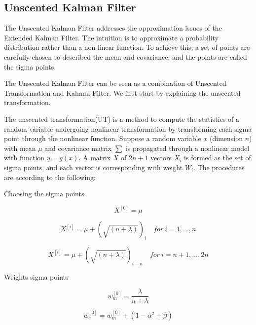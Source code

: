 \documentclass[10pt,twocolumn,letterpaper]{article}
\begin{document}
\subsection{Unscented Kalman Filter}

The Unscented Kalman Filter\cite{ref:Julier} addresses the approximation issues of the Extended Kalman Filter. The intuition is to approximate a probability distribution rather than a non-linear function. To achieve this, a set of points are carefully chosen to described the mean and covariance, and the points are called the sigma points\cite{ref:ryan}.

The Unscented Kalman Filter can be seen as a combination of Unscented Transformation and Kalman Filter. We first start by explaining the unscented transformation\cite{ref:julierUhlmann}.

The unscented transformation(UT) is a method to compute the statistics of a random variable undergoing nonlinear transformation by transforming each sigma point through the nonlinear function. Suppose a random variable $x$ (dimension $n$) with mean $\mu$ and covariance matrix $
\sum$ is propagated through a nonlinear model with function $y=g(x)$. A matrix $X$ of $2n+1$ vectors $X_i$ is formed as the set of sigma points, and each vector is corresponding with weight $W_i$. The procedures are according to the following:

Choosing the sigma points

\begin{equation}
X^{[0]}=\mu
\end{equation}

\begin{equation}
X^{[i]}=\mu+(\sqrt{(n+\lambda)})_i\quad for \ i=1, ..., n
\end{equation}

\begin{equation}
X^{[i]}=\mu+(\sqrt{(n+\lambda)})_{i-n}\quad for \ i=n+1, ..., 2n
\end{equation}

Weights sigma points

\begin{equation}
w_m^{[0]}=\frac{\lambda}{n+\lambda}
\end{equation}

\begin{equation}
w_c^{[0]}=w_m^{[0]}+(1-\alpha^2+\beta)
\end{equation}
\end{document}
